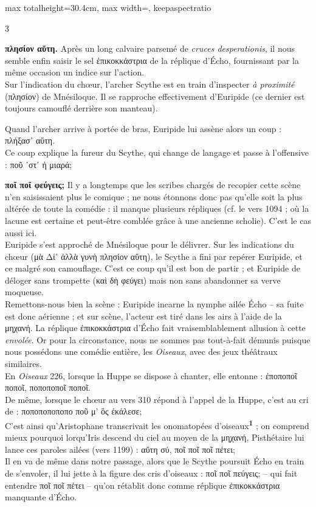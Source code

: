 \documentclass[11pt,twoside]{book}
\newcommand{\italique}[1]{\textit{#1}}
\newcommand{\latin}[1]{\textit{#1}}
\newcommand{\marqueur}[1]{\textsuperscript{\color{rubricRed}\textbf{#1}}}
\begin{document}
\begin{adjustbox}{max totalheight=30.4cm, max width=\textwidth, keepaspectratio}
\begin{minipage}{\textwidth}
{\begin{multicols}{3}
\par\vspace{1.5pt}
 \textbf{πλησίον αὕτη.} Après un long calvaire parsemé de \latin{cruces desperationis}, il nous semble enfin saisir le sel ἐπικοκκάστρια de la réplique d'Écho, fournissant par la même occasion un indice sur l'action.\\ Sur l'indication du chœur, l'archer Scythe est en train d'inspecter \italique{à proximité} (πλησίον) de Mnésiloque. Il se rapproche effectivement d'Euripide (ce dernier est toujours camouflé derrière son manteau).
\par\vspace{1.5pt}
\noindent Quand l'archer arrive à portée de bras, Euripide lui assène alors un coup : πλήξασ᾿ αὕτη.\\ Ce coup explique la fureur du Scythe, qui change de langage et passe à l'offensive : ποῦ ᾿στ᾽ ἠ μιαρά;
\par\vspace{1.5pt}
 \textbf{ποῖ ποῖ φεύγεις;} Il y a longtemps que les scribes chargés de recopier cette scène n'en saisissaient plus le comique ; ne nous étonnons donc pas qu'elle soit la plus altérée de toute la comédie : il manque plusieurs répliques (cf. le vers 1094 ; où la lacune est certaine et peut-être comblée grâce à une ancienne scholie). C'est le cas aussi ici.\\ Euripide s'est approché de Mnésiloque pour le délivrer. Sur les indications du chœur (μὰ Δί᾽ ἀλλὰ γυνὴ πλησίον αὕτη), le Scythe a fini par repérer Euripide, et ce malgré son camouflage. C'est ce coup qu'il est bon de partir ; et Euripide de déloger sans trompette (καὶ δὴ φεύγει) mais non sans abandonner sa verve moqueuse. \\ Remettons-nous bien la scène : Euripide incarne la nymphe ailée Écho -- sa fuite est donc aérienne ; et sur scène, l'acteur est tiré dans les airs à l'aide de la μηχανή. La réplique ἐπικοκκάστρια d'Écho fait vraisemblablement allusion à cette \italique{envolée}. Or pour la circonstance, nous ne sommes pas tout-à-fait démunis puisque nous possédons une comédie entière, les \italique{Oiseaux}, avec des jeux théâtraux similaires.\\ En \italique{Oiseaux} 226, lorsque la Huppe se dispose à chanter, elle entonne : ἐποποποῖ ποποῖ, ποποποποῖ ποποῖ.\\ De même, lorsque le chœur au vers 310 répond à l'appel de la Huppe, c'est au cri de : ποποποποποπο ποῦ μ' ὃς ἐκάλεσε;\\ C'est ainsi qu'Aristophane transcrivait les onomatopées d'oiseaux\marqueur{1} ; on comprend mieux pourquoi lorqu'Iris descend du ciel au moyen de la μηχανή, Pisthétaire lui lance ces paroles ailées (vers 1199) : αὕτη σύ, ποῖ ποῖ ποῖ πέτει;\\ Il en va de même dans notre passage, alors que le Scythe poursuit Écho en train de s'envoler, il lui jette à la figure des cris d'oiseaux : ποῖ ποῖ πεύγεις; -- qui fait entendre ποῖ ποῖ πέτει -- qu'on rétablit donc comme réplique ἐπικοκκάστρια manquante d'Écho.

\end{multicols}}
\end{minipage}
\end{adjustbox}
\end{document}
